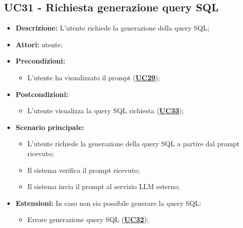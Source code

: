 \subsection{UC31 - Richiesta generazione query SQL}
\label{sec:UC31}
\begin{itemize}
    \item \textbf{Descrizione:} L'utente richiede la generazione della query SQL;
    \item \textbf{Attori:} utente;
    \item \textbf{Precondizioni:} 
    \begin{itemize}
    	\item L'utente ha visualizzato il prompt (\hyperref[sec:UC29]{\textbf{UC29}});
    \end{itemize}
    \item \textbf{Postcondizioni:} 
    \begin{itemize}
    	\item L'utente visualizza la query SQL richiesta (\hyperref[sec:UC33]{\textbf{UC33}});
    \end{itemize}
    \item \textbf{Scenario principale:}
    \begin{itemize}
    	\item L'utente richiede la generazione della query SQL a partire dal prompt ricevuto;
    	\item Il sistema verifica il prompt ricevuto;
    	\item Il sistema invia il prompt al servizio LLM esterno;
    \end{itemize}
    \item \textbf{Estensioni:} In caso non sia possibile generare la query SQL:
    \begin{itemize}
    	\item Errore generazione query SQL (\hyperref[sec:UC32]{\textbf{UC32}});
    \end{itemize}
\end{itemize}

